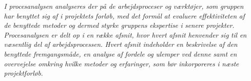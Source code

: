 \textit{I procesanalysen analyseres der på de arbejdsproceser og værktøjer, som gruppen har benyttet sig af i projektets forløb, med det formål at evaluere effektiviteten af de benyttede metoder og dermed styrke gruppens ekspertise i senere projekter. Procesanalysen er delt op i en række afsnit, hvor hvert afsnit henvender sig til en væsentlig del af arbejdsprocessen. Hvert afsnit indeholder en beskrivelse af den benyttede fremgangsmåde, en analyse af fordele og ulemper ved denne samt en overvejelse omkring hvilke metoder og erfaringer, som bør inkorporeres i næste projektforløb.}